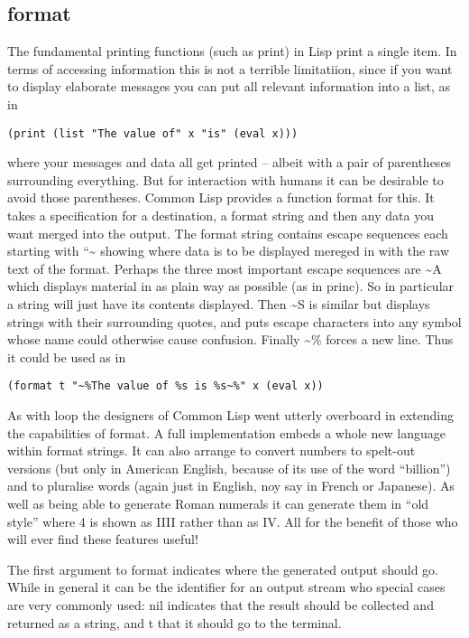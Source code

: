 \subsection{{\tx format}}
The fundamental printing functions (such as {\tx print}) in Lisp print a
single item. In terms of accessing information this is not a terrible
limitatiion, since if you want to display elaborate messages you can
put all relevant information into a list, as in
{\small\begin{verbatim}
(print (list "The value of" x "is" (eval x)))
\end{verbatim}}
where your messages and data all get printed -- albeit with a pair of
parentheses surrounding everything. But for interaction with humans it can
be desirable to avoid those parentheses. Common Lisp provides a function
{\tx format} for this. It takes a specification for a destination, a format
string and then any data you want merged into the output. The format string
contains escape sequences each starting with ``{\tx \textasciitilde} showing
where data is to be displayed mereged in with the raw text of the format.
Perhaps the three most important escape sequences are {\tx \textasciitilde{}A}
which displays material in as plain way as possible (as in {\tx princ}). So
in particular a string will just have its contents displayed. Then
{\tx \textasciitilde{}S} is similar but displays strings with their
surrounding quotes, and puts escape characters into any symbol whose
name could otherwise cause confusion. Finally {\tx \textasciitilde{}\%}
forces a new line. Thus it could be used as in
{\small\begin{verbatim}
(format t "~%The value of %s is %s~%" x (eval x))
\end{verbatim}}

As with {\tx loop} the designers of Common Lisp went utterly overboard
in extending the capabilities of {\tx format}. A full implementation embeds
a whole new language within format strings. It can also arrange to
convert numbers to spelt-out versions (but only in American English,
because of its use of the word ``billion'') and to pluralise
words (again just in English, noy say in French or Japanese).
As well as being able to generate Roman
numerals it can generate them in ``old style'' where 4 is shown as {\tx IIII}
rather than as {\tx IV}. All for the benefit of those who will ever find
these features useful!

The first argument to {\tx format} indicates where the generated output should
go. While in general it can be the identifier for an output stream who
special cases are very commonly used: {\tx nil} indicates that the
result should be collected and returned as a string, and {\tx t} that it
should go to the terminal.

